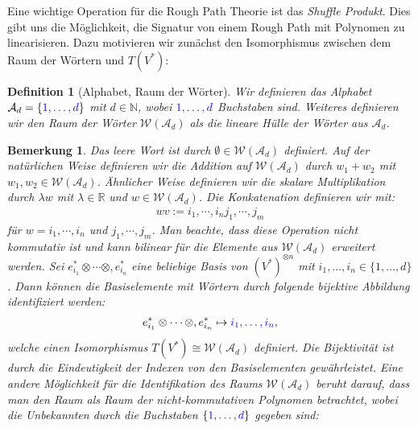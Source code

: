 \documentclass[12pt,titlepage,headsepline]{article}
\newtheorem{definition}{Definition}[section]
\newtheorem*{bemerkung*}{Bemerkung}
\begin{document}
      \hfill\break
      Eine wichtige Operation für die Rough Path Theorie ist das \textit{Shuffle Produkt}. Dies gibt uns die Möglichkeit, die Signatur von einem Rough Path mit Polynomen zu linearisieren. Dazu motivieren wir zunächst den Isomorphismus zwischen dem Raum der Wörtern und $T(V^*)$:

      \begin{definition}[Alphabet, Raum der Wörter]
        Wir definieren das Alphabet $\mathcal{A}_d = \{ \textcolor{blue}{1,\dotsc,d}\}$ mit $d \in \mathbb{N}$, wobei $\textcolor{blue}{1, \dotsc, d}$ Buchstaben sind. Weiteres definieren wir den Raum der Wörter $\mathcal{W}(\mathcal{A}_d)$ als die lineare Hülle der Wörter aus $\mathcal{A}_d$.
      \end{definition}
      \begin{bemerkung*}
        \hfill\break
        \textup{
        Das leere Wort ist durch $\emptyset \in \mathcal{W}(\mathcal{A}_d)$ definiert. Auf der natürlichen Weise definieren wir die Addition auf $\mathcal{W}(\mathcal{A}_d)$ durch $w_1 + w_2$ mit $w_1,w_2 \in \mathcal{W}(\mathcal{A}_d)$. Ähnlicher Weise definieren wir die skalare Multiplikation durch $\lambda w$ mit $\lambda \in \mathbb{R}$ und $w\in\mathcal{W}(\mathcal{A}_d)$.
        Die Konkatenation definieren wir mit:
        \begin{align*}
          wv := i_1,\dotsm,i_nj_1,\dotsm,j_m
        \end{align*}
        für $w=i_1,\dotsm,i_n$ und $j_1,\dotsm,j_m$. Man beachte, dass diese Operation nicht kommutativ ist und kann bilinear für die Elemente aus $\mathcal{W}(\mathcal{A}_d)$ erweitert werden.
        Sei $e^*_{i_1}\otimes \dotsm \otimes,e^*_{i_n}$ eine beliebige Basis von $(V^*)^{\otimes n}$ mit $i_1,\dotsc,i_n \in \{ 1, \dotsc, d \}$. Dann können die Basiselemente mit Wörtern durch folgende bijektive Abbildung identifiziert werden:
        \begin{align*}
          e^*_{i_1}\otimes \dotsm \otimes,e^*_{i_n} \mapsto \textcolor{blue}{i_1,\dotsc,i_n},
        \end{align*}
        welche einen Isomorphismus $T(V^*) \cong \mathcal{W}(\mathcal{A}_d)$ definiert. Die Bijektivität ist durch die Eindeutigkeit der Indexen von den Basiselementen gewährleistet.
        \hfill\break
        Eine andere Möglichkeit für die Identifikation des Raums $\mathcal{W}(\mathcal{A}_d)$ beruht darauf, dass man den Raum als Raum der nicht-kommutativen Polynomen betrachtet, wobei die Unbekannten durch die Buchstaben $\{ \textcolor{blue}{1, \dotsc, d} \}$ gegeben sind:
}
\end{bemerkung*}
\end{document}
